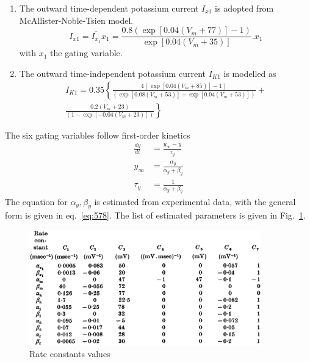 \begin{enumerate}
\item The outward time-dependent potassium current $I_{x1}$ is adopted
  from McAllister-Noble-Tsien model.
  \begin{equation}
    \label{eq:618}
    I_{x1} = \overline{I_{x_1}}x_1 = \frac{0.8(\exp [0.04(V_m + 77)]-
      1)}{\exp [0.04(V_m + 35)]} .x_1
  \end{equation}
with $x_1$ the gating variable. 

\item  The outward time-independent potassium current $I_{K1}$ is modelled as 
  \begin{equation}
    \label{eq:619}
    \begin{split}
      I_{K1} = 0.35\left\{\frac{4(\exp [0.04(V_m + 85)]- 1)}{(\exp
        [0.08(V_m + 53)] + \exp [0.04(V_m + 53)]) } \right.+ \\
    \left.\frac{0.2(V_m + 23)}{(1-\exp [-0.04(V_m + 23)])}\right\} 
    \end{split}
  \end{equation}


\end{enumerate}

The six gating variables follow first-order kinetics
\begin{equation}
  \label{eq:577}
  \begin{split}
    \frac{dy}{dt} &= \frac{y_\infty-y}{\tau_y} \\
    y_\infty &= \frac{\alpha_y}{\alpha_y+\beta_y} \\
    \tau_y &= \frac{1}{\alpha_y+\beta_y} 
  \end{split}
\end{equation}
The equation for $\alpha_y, \beta_y$ is estimated from experimental
data, with the general form is given in eq.~\eqref{eq:578}. The list
of estimated parameters is given in Fig.~\ref{fig:beeler_reuter_3}.

\begin{figure}[hbt]
  \centerline{\includegraphics[height=5cm,
    angle=0]{./images/beeler_reuter_3.eps}}
  \caption{Rate constants values}
  \label{fig:beeler_reuter_3}
\end{figure}



